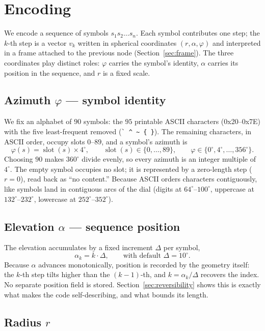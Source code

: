 \documentclass[11pt]{article}
\newcommand{\slotf}{\operatorname{slot}}
\renewcommand{\deg}{^{\circ}}  %
\begin{document}
\section{Encoding}\label{sec:encoding}

We encode a sequence of symbols $s_1 s_2 \dots s_n$. Each symbol contributes one step; the
$k$-th step is a vector $v_k$ written in spherical coordinates $(r,\alpha,\varphi)$ and
interpreted in a frame attached to the previous node (Section~\ref{sec:frame}). The three
coordinates play distinct roles: $\varphi$ carries the symbol's identity, $\alpha$ carries
its position in the sequence, and $r$ is a fixed scale.

\subsection{Azimuth $\varphi$ --- symbol identity}

We fix an alphabet of $90$ symbols: the $95$ printable ASCII characters (0x20--0x7E) with
the five least-frequent removed (\verb.` ^ ~ { }.). The remaining characters, in ASCII
order, occupy slots $0$--$89$, and a symbol's azimuth is
\[
  \varphi(s) = \slotf(s)\times 4\deg, \qquad \slotf(s)\in\{0,\dots,89\}, \qquad
  \varphi\in\{0\deg,4\deg,\dots,356\deg\}.
\]
Choosing $90$ makes $360\deg$ divide evenly, so every azimuth is an integer multiple of
$4\deg$. The empty symbol occupies no slot; it is represented by a zero-length step ($r=0$),
read back as ``no content.'' Because ASCII orders characters contiguously, like symbols land
in contiguous arcs of the dial (digits at $64\deg$--$100\deg$, uppercase at
$132\deg$--$232\deg$, lowercase at $252\deg$--$352\deg$).

\subsection{Elevation $\alpha$ --- sequence position}

The elevation accumulates by a fixed increment $\Delta$ per symbol,
\[
  \alpha_k = k\cdot\Delta, \qquad \text{with default } \Delta = 10\deg.
\]
Because $\alpha$ advances monotonically, position is recorded by the geometry itself: the
$k$-th step tilts higher than the $(k{-}1)$-th, and $k = \alpha_k/\Delta$ recovers the index.
No separate position field is stored. Section~\ref{sec:reversibility} shows this is exactly
what makes the code self-describing, and what bounds its length.

\subsection{Radius $r$}
\end{document}
